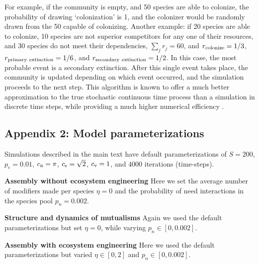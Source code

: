\documentclass[twocolumn,preprintnumbers,amsmath,amssymb,superscriptaddress,linenumbers]{revtex4-1}
\newcommand{\rr}[1]{{\rm #1}}
\begin{document}
\begin{bibunit}
For example, if the community is empty, and 50 species are able to colonize, the probability of drawing `colonization' is 1, and the colonizer would be randomly drawn from the 50 capable of colonizing.
Another example: if 20 species are able to colonize, 10 species are not superior competitors for any one of their resources, and 30 species do not meet their dependencies, $\sum_j{r_j} = 60$, and $r_\rr{colonize} = 1/3$, $r_\rr{primary~extinction} = 1/6$, and $r_\rr{secondary~extinction} = 1/2$.
In this case, the most probable event is a secondary extinction.
After this single event takes place, the community is updated depending on which event occurred, and the simulation proceeds to the next step.
This algorithm is known to offer a much better approximation to the true stochastic continuous time process than a simulation in discrete time steps, while providing a much higher numerical efficiency \cite{Gillespie1977}.


\subsection*{Appendix 2: Model parameterizations}
Simulations described in the main text have default parameterizations of $S=200$, $p_e=0.01$, $c_{\rm n} = \pi$, $c_{\rm e} = \sqrt{2}$, $c_{\rm v} = 1$, and $4000$ iterations (time-steps).

\noindent \textbf{Assembly without ecosystem engineering} Here we set the average number of modifiers made per species $\eta = 0$ and the probability of need interactions in the species pool $p_n=0.002$.

\noindent \textbf{Structure and dynamics of mutualisms} Again we used the default parameterizations but set $\eta = 0$, while varying $p_n \in [0,0.002]$.

\noindent \textbf{Assembly with ecosystem engineering} Here we used the default parameterizations but varied $\eta \in [0,2]$ and $p_n \in [0,0.002]$.



\end{bibunit}
\end{document}
